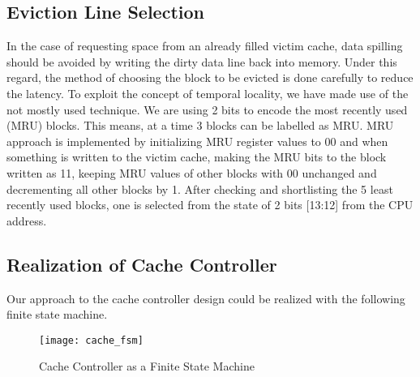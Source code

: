 \documentclass[12pt]{article}
\begin{document}
    \subsection{Eviction Line Selection}
    In the case of requesting space from an already filled victim cache, data spilling should be avoided by writing the dirty data line back into memory.
    Under this regard, the method of choosing the block to be evicted is done carefully to reduce the latency.
    To exploit the concept of temporal locality, we have made use of the not mostly used technique.
    We are using 2 bits to encode the most recently used (MRU) blocks.
    This means, at a time 3 blocks can be labelled as MRU.
    MRU approach is implemented by initializing MRU register values to 00 and when something is written to the victim cache, making the MRU bits to the block written as 11, keeping MRU values of other blocks with 00 unchanged and decrementing all other blocks by 1.
    After checking and shortlisting the 5 least recently used blocks, one is selected from the state of 2 bits [13:12] from the CPU address.

    \subsection{Realization of Cache Controller}
    Our approach to the cache controller design could be realized with the following finite state machine.
    \begin{figure}[h]
        \label{fig:cache_fsm}
        \begin{center}
            \texttt{[image: cache\_fsm]}
        \end{center}
        \caption{Cache Controller as a Finite State Machine}
    \end{figure}
\end{document}
